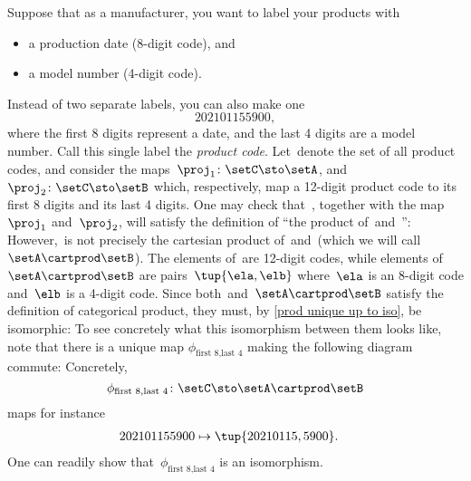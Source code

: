 \begin{example}
    \label{ex:univ-prop-prod}
    Suppose that as a manufacturer, you want to label your products with
    \begin{itemize}
        \item a production date (8-digit code), and
        \item a model number (4-digit code).
    \end{itemize}
    Instead of two separate labels, you can also make one
    \begin{equation}
        \label{eq:exa-prod-univ-prop-code}
        202101155900,
    \end{equation}
    where the first 8 digits represent a date, and the last 4 digits are a model number.
    Call this single label the \emph{product code}.
    Let~\setC denote the set of all product codes, and consider the maps~$\proj_1\colon \setC \sto \setA$, and~$\proj_2\colon \setC \sto \setB$ which, respectively, map a 12-digit product code to its first 8 digits and its last 4 digits.
    One may check that~\setC, together with the map~$\proj_1$ and~$\proj_2$, will satisfy the definition of ``the product of~\setA and~\setB'':
    However,~\setC is not precisely the cartesian product of~\setA and~\setB (which we will call~$\setA\cartprod \setB$).
    The elements of~\setC are 12-digit codes, while elements of~$\setA\cartprod \setB$ are pairs~$\tup{\ela,\elb}$ where~$\ela$ is an 8-digit code and~$\elb$ is a 4-digit code.
    Since both~\setC and~$\setA\cartprod \setB$ satisfy the definition of categorical product, they must, by \cref{prod unique up to iso}, be isomorphic:
    To see concretely what this isomorphism between them looks like, note that there is a unique map $\phi_{\text{first 8},\text{last 4}}$ making the following diagram commute:
    Concretely,
    \begin{equation}
        \label{eq:exa-univ-iso}
        \phi_{\text{first 8},\text{last 4}}\colon \setC \sto \setA\cartprod \setB
    \end{equation}
    maps for instance
    \begin{equation}
        \label{eq:exa-univ-iso-concrete}
        \begin{aligned}
            202101155900 & \mapsto \tup{20210115,5900}.
        \end{aligned}
    \end{equation}
    One can readily show that~$\phi_{\text{first 8},\text{last 4}}$ is an isomorphism.
\end{example}

